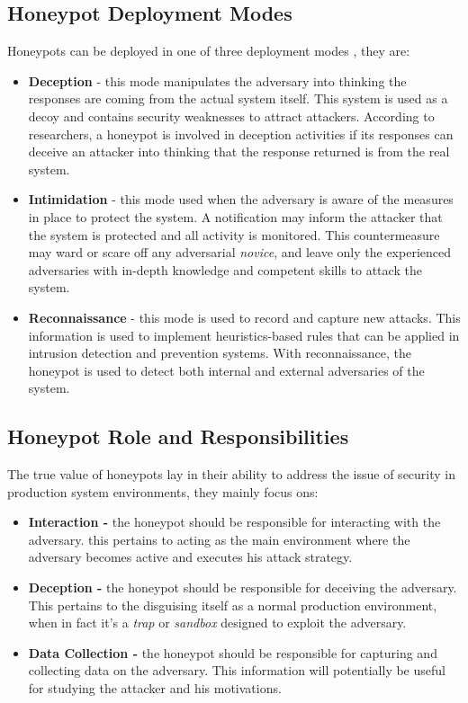 \documentclass[grad,lot,lof,11pt,oneside,onehalfspace]{RUthesis}
\begin{document}
\subsection{Honeypot Deployment Modes}
Honeypots can be deployed in one of three deployment modes \cite{campbell_survey_2015}, they are:
\begin{itemize}
	\item \textbf{Deception} - this mode manipulates the adversary into thinking the responses are coming from the actual system itself. This system is used as a decoy and contains security weaknesses to attract attackers. According to researchers, a honeypot is involved in deception activities if its responses can deceive an attacker into thinking that the response returned is from the real system. 
	\item \textbf{Intimidation} - this mode used when the adversary is aware of the measures in place to protect the system. A notification may inform the attacker that the system is protected and all activity is monitored. This countermeasure may ward or scare off any adversarial \textit{novice}, and leave only the experienced adversaries with in-depth knowledge and competent skills to attack the system. 
	\item \textbf{Reconnaissance} - this mode is used to record and capture new attacks. This information is used to implement heuristics-based rules that can be applied in intrusion detection and prevention systems. With reconnaissance,  the honeypot is used to detect both internal and external adversaries of the system. 
\end{itemize}
\subsection{Honeypot Role and Responsibilities}
The true value of honeypots lay in their ability to address the issue of security in production system environments, they mainly focus ons:
\begin{itemize}
	\item \textbf{Interaction -}
	the honeypot should be responsible for interacting with the adversary. this pertains to acting as the main environment where the adversary becomes active and executes his attack strategy. 
	\item \textbf{Deception -}
	the honeypot should be responsible for deceiving the adversary. This pertains to the disguising itself as a normal production environment, when in fact it's a \textit{trap} or \textit{sandbox} designed to exploit the adversary. 
	\item \textbf{Data Collection -}
	the honeypot should be responsible for capturing and collecting data on the adversary. This information will potentially be useful for studying the attacker and his motivations. 
\end{itemize}
\end{document}
